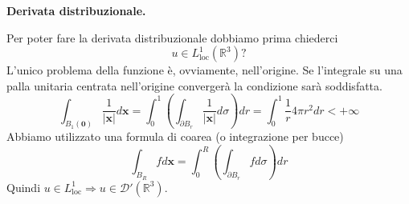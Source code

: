 \documentclass[10pt,a4paper,twoside,openright]{book}
\newcommand{\x}{\mathbf{x}}
\begin{document}
\textbf{Derivata distribuzionale.}

Per poter fare la derivata distribuzionale dobbiamo prima chiederci
\begin{equation*}
	u\in L^{1}_{\text{loc}}\left(\mathbb{R}^{3}\right) ?
\end{equation*}
L'unico problema della funzione è, ovviamente, nell'origine. Se l'integrale su una palla unitaria centrata nell'origine convergerà la condizione sarà soddisfatta.
\begin{equation*}
	\int _{B_{1}(\mathbf{0})}\frac{1}{| \x| } d\x =\int ^{1}_{0}\left(\int _{\partial B_{r}}\frac{1}{| \x| } d\sigma \right) dr=\int ^{1}_{0}\frac{1}{r} 4\pi r^{2} dr< +\infty 
\end{equation*}
Abbiamo utilizzato una formula di coarea (o integrazione per bucce) 
\begin{equation*}
	\int _{B_{R}} fd\x =\int ^{R}_{0}\left(\int _{\partial B_{r}} fd\sigma \right) dr
\end{equation*}
Quindi $\displaystyle u\in L^{1}_{\text{loc}} \Rightarrow u\in \mathcal{D} '\left(\mathbb{R}^{3}\right)$.
\end{document}
